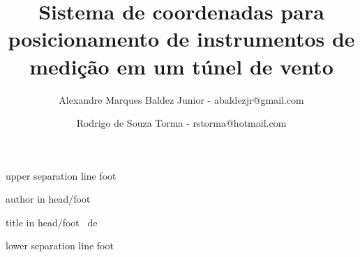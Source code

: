 \usepackage[utf8]{inputenc}
\usepackage{amsmath,amssymb}
\usepackage[brazil]{varioref}
\usepackage[english,brazil]{babel}
\usepackage{graphicx}
\usepackage{listings}
\usepackage{url}
\usepackage{colortbl}
\usepackage{setspace}
\usepackage{multimedia}
\usepackage{microtype}



\beamertemplatetransparentcovereddynamic
\newcommand{\frameofframes}{/}
\newcommand{\setframeofframes}[1]{\renewcommand{\frameofframes}{#1}}
\setframeofframes{de}
\makeatletter
{}
  {%
    \begin{beamercolorbox}[colsep=1.5pt]{upper separation line foot}
    \end{beamercolorbox}
    \begin{beamercolorbox}[ht=2.5ex,dp=1.125ex,%
      leftskip=.3cm,rightskip=.3cm plus1fil]{author in head/foot}%
      \hfill%
      {\insertshortinstitute}%
    \end{beamercolorbox}%
    \begin{beamercolorbox}[ht=2.5ex,dp=1.125ex,%
      leftskip=.3cm,rightskip=.3cm plus1fil]{title in head/foot}%
      {\insertshorttitle}%
      \hfill%
      {\insertframenumber~\frameofframes~\inserttotalframenumber}
    \end{beamercolorbox}%
    \begin{beamercolorbox}[colsep=1.5pt]{lower separation line foot}
    \end{beamercolorbox}
  }
\makeatother
\title[Sistema de coordenadas para posicionamento de instrumentos de medição em um túnel de vento]
{\normalsize Sistema de coordenadas para posicionamento de instrumentos de medição em um túnel de vento}
\author[Baldez Jr, Torma]{Alexandre Marques Baldez Junior - abaldezjr@gmail.com \and Rodrigo de Souza Torma - rstorma@hotmail.com}

